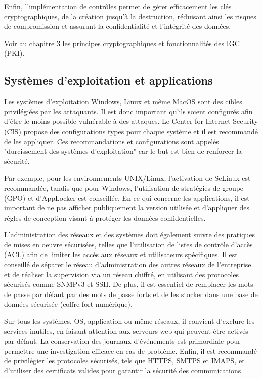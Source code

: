 Enfin, l'implémentation de contrôles permet de gérer efficacement les clés cryptographiques, de la création jusqu'à la destruction, réduisant ainsi les risques de compromission et assurant la confidentialité et l'intégrité des données.

Voir au chapitre 3 les principes cryptographiques et fonctionnalités des IGC (PKI).

\subsection{Systèmes d'exploitation et applications}

Les systèmes d'exploitation Windows, Linux et même MacOS sont des cibles privilégiées par les attaquants. Il est donc important qu'ils soient configurés afin d'être le moins possible vulnérable à des attaques. Le Center for Internet Security (CIS) propose des configurations types pour chaque système et il est recommandé de les appliquer. Ces recommandations et configurations sont appelés "durcissement des systèmes d'exploitation" car le but est bien de renforcer la sécurité.

Par exemple, pour les environnements UNIX/Linux, l'activation de SeLinux est recommandée, tandis que pour Windows, l'utilisation de stratégies de groupe (GPO) et d'AppLocker est conseillée. En ce qui concerne les applications, il est important de ne pas afficher publiquement la version utilisée et d'appliquer des règles de conception visant à protéger les données confidentielles.

L'administration des réseaux et des systèmes doit également suivre des pratiques de mises en oeuvre sécurisées, telles que l'utilisation de listes de contrôle d'accès (ACL) afin de limiter les accès aux réseaux et utilisateurs spécifiques. Il est conseillé de séparer le réseau d'administration des autres réseaux de l'entreprise et de réaliser la supervision via un réseau chiffré, en utilisant des protocoles sécurisés comme SNMPv3 et SSH. De plus, il est essentiel de remplacer les mots de passe par défaut par des mots de passe forts et de les stocker dans une base de données sécurisée (coffre fort numérique).

Sur tous les systèmes, OS, application ou même réseaux, il convient d'exclure les services inutiles, en faisant attention aux serveurs web qui peuvent être activés par défaut. La conservation des journaux d'événements est primordiale pour permettre une investigation efficace en cas de problème. Enfin, il est recommandé de privilégier les protocoles sécurisés, tels que HTTPS, SMTPS et IMAPS, et d'utiliser des certificats valides pour garantir la sécurité des communications.


